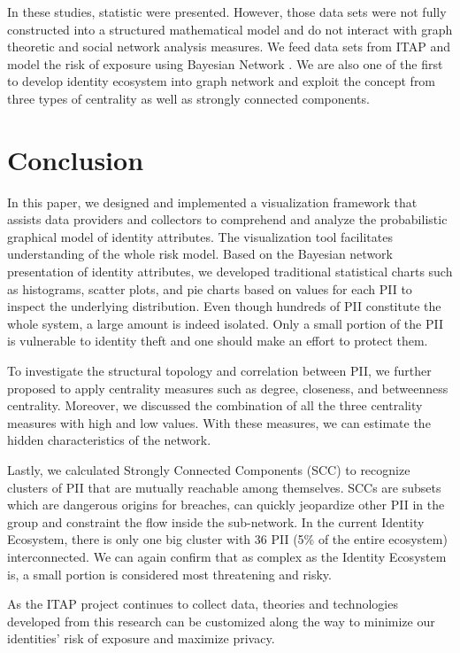 \documentclass[conference]{IEEEtran}
\begin{document}
 
In these studies, statistic were presented. However, those data sets were not fully constructed into a structured mathematical model and do not interact with graph theoretic and social network analysis measures. We feed data sets from ITAP and model the risk of exposure using Bayesian Network \cite{EcosystemModeling}. We are also one of the first to develop identity ecosystem into graph network and exploit the concept from three types of centrality as well as strongly connected components.  

\section{Conclusion}

In this paper, we designed and implemented a visualization framework that assists data providers and collectors to comprehend and analyze the probabilistic graphical model of identity attributes. The visualization tool facilitates understanding of the whole risk model. Based on the Bayesian network presentation of identity attributes, we developed traditional statistical charts such as histograms, scatter plots, and pie charts based on values for each PII to inspect the underlying distribution. Even though hundreds of PII constitute the whole system, a large amount is indeed isolated. Only a small portion of the PII is vulnerable to identity theft and one should make an effort to protect them.

To investigate the structural topology and correlation between PII, we further proposed to apply centrality measures such as degree, closeness, and betweenness centrality. Moreover,  we discussed the combination of all the three centrality measures with high and low values. With these measures, we can estimate the hidden characteristics of the network.

Lastly, we calculated Strongly Connected Components (SCC) to recognize clusters of PII that are mutually reachable among themselves.  SCCs are subsets which are dangerous origins for breaches, can quickly jeopardize other PII in the group and constraint the flow inside the sub-network. In the current Identity Ecosystem, there is only one big cluster with 36 PII (5\% of the entire ecosystem) interconnected. We can again confirm  that as complex as the Identity Ecosystem is, a small portion is considered most threatening and risky. 

As the ITAP project continues to collect data, theories and technologies developed from this research can be customized along the way to minimize our identities'  risk of exposure and maximize privacy.
\end{document}
